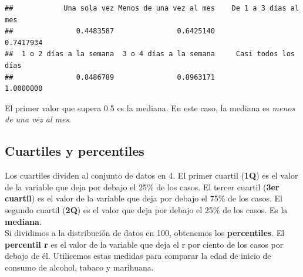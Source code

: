 \documentclass[spanish,]{book}
\newenvironment{Shaded}{\begin{snugshade}}{\end{snugshade}}
\newcommand{\KeywordTok}[1]{\textcolor[rgb]{0.13,0.29,0.53}{\textbf{#1}}}
\newcommand{\DataTypeTok}[1]{\textcolor[rgb]{0.13,0.29,0.53}{#1}}
\newcommand{\DecValTok}[1]{\textcolor[rgb]{0.00,0.00,0.81}{#1}}
\newcommand{\StringTok}[1]{\textcolor[rgb]{0.31,0.60,0.02}{#1}}
\newcommand{\OtherTok}[1]{\textcolor[rgb]{0.56,0.35,0.01}{#1}}
\newcommand{\OperatorTok}[1]{\textcolor[rgb]{0.81,0.36,0.00}{\textbf{#1}}}
\newcommand{\NormalTok}[1]{#1}
\begin{document}
\begin{verbatim}
##            Una sola vez Menos de una vez al mes    De 1 a 3 días al mes 
##               0.4483587               0.6425140               0.7417934 
##  1 o 2 días a la semana  3 o 4 días a la semana     Casi todos los días 
##               0.8486789               0.8963171               1.0000000
\end{verbatim}

El primer valor que supera 0.5 es la mediana. En este caso, la mediana
es \emph{menos de una vez al mes}.

\subsection{Cuartiles y percentiles}\label{cuartiles-y-percentiles}

Los cuartiles dividen al conjunto de datos en 4. El primer cuartil
(\textbf{1Q}) es el valor de la variable que deja por debajo el 25\% de
los casos. El tercer cuartil (\textbf{3er cuartil}) es el valor de la
variable que deja por debajo el 75\% de los casos. El segundo cuartil
(\textbf{2Q}) es el valor que deja por debajo el 25\% de los casos. Es
la \textbf{mediana}.\\
Si dividimos a la distribución de datos en 100, obtenemos los
\textbf{percentiles}. El \textbf{percentil r} es el valor de la variable
que deja el r por ciento de los casos por debajo de él. Utilicemos estas
medidas para comparar la edad de inicio de consumo de alcohol, tabaco y
marihuana.

\begin{Shaded}
\end{Shaded}
\end{document}
